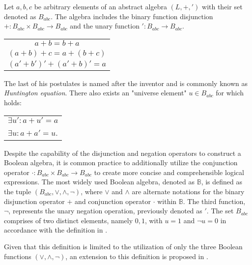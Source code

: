 \begin{definition}\label{Def:BasBool}
	Let $a, b, c$ be arbitrary elements of an abstract algebra $(L, +, ')$ with their set denoted as $B_{abc}$. The algebra includes the binary function disjunction $+ : B_{abc} \times B_{abc} \rightarrow B_{abc}$ and the unary function $' : B_{abc} \rightarrow B_{abc}$.
	\begin{table}[h]
		\centering
		\begin{tabular}{c}
			$a + b = b + a$ \\
			$(a + b) + c =  a + (b + c)$\\
			$(a' + b')' + (a' + b)' = a$\\
		\end{tabular}
	\end{table}
	
	The last of his postulates is named after the inventor and is commonly known as \textit{Huntington equation}. 
	\newpage
	There also exists an "universe element" $u \in B_{abc}$ for which holds:
	
	\begin{table}[h]
		\centering
		\begin{tabular}{l}
			$\exists u' : a + u' = a$ \\
			$\exists u : a + a' = u$. \\
		\end{tabular}
	\end{table}
	
\end{definition}

Despite the capability of the disjunction and negation operators to construct a Boolean algebra, it is common practice to additionally utilize the conjunction operator $\cdot : B_{abc} \times B_{abc} \rightarrow B_{abc}$ to create more concise and comprehensible logical expressions.
The most widely used Boolean algebra, denoted as $\mathbb{B}$, is defined as the tuple $(B_{abc}, \vee, \wedge, \neg)$, where $\vee$ and $\wedge$ are alternate notations for the binary disjunction operator $+$ and conjunction operator $\cdot$ within $\mathbb{B}$. The third function, $\neg$, represents the unary negation operation, previously denoted as $'$. The set $B_{abc}$ comprises of two distinct elements, namely ${0, 1}$, with $u=1$ and $\neg u = 0$ in accordance with the definition in \cite{Boolean_def}.

Given that this definition is limited to the utilization of only the three Boolean functions $(\vee, \wedge, \neg)$, an extension to this definition is proposed in \cite{muti_output_boolean_function}.

